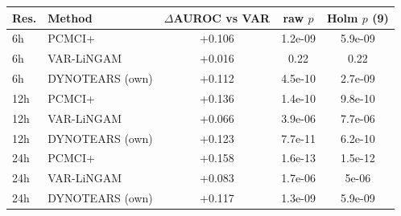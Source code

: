\begin{tabular}{@{}llccc@{}}
\toprule
Res. & Method & $\Delta$AUROC vs VAR & raw $p$ & Holm $p$ (9) \\
\midrule
6h & PCMCI+ & +0.106 & 1.2e-09 & 5.9e-09 \\
6h & VAR-LiNGAM & +0.016 & 0.22 & 0.22 \\
6h & DYNOTEARS (own) & +0.112 & 4.5e-10 & 2.7e-09 \\
12h & PCMCI+ & +0.136 & 1.4e-10 & 9.8e-10 \\
12h & VAR-LiNGAM & +0.066 & 3.9e-06 & 7.7e-06 \\
12h & DYNOTEARS (own) & +0.123 & 7.7e-11 & 6.2e-10 \\
24h & PCMCI+ & +0.158 & 1.6e-13 & 1.5e-12 \\
24h & VAR-LiNGAM & +0.083 & 1.7e-06 & 5e-06 \\
24h & DYNOTEARS (own) & +0.117 & 1.3e-09 & 5.9e-09 \\
\bottomrule
\end{tabular}

